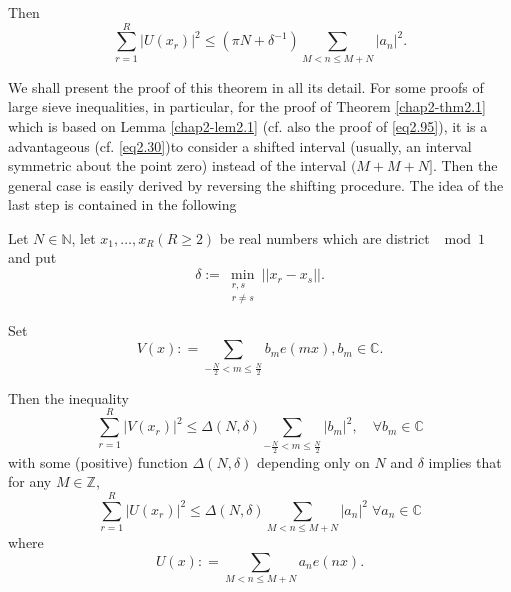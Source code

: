 Then
\begin{equation*}
\sum_{r=1}^R |U (x_r) |^2 \leq ( \pi N+ \delta^{-1}) \sum_{M < n \leq
  M+N}|a_n|^2. \tag{2.11}\label{eq2.11}
\end{equation*}

We shall present the proof of this theorem in all its detail. For some
proofs of large sieve inequalities, in particular, for the proof of
Theorem \ref{chap2-thm2.1} which is based on Lemma \ref{chap2-lem2.1} 
(cf. also the proof of \eqref{eq2.95}), it is a advantageous
(cf. \eqref{eq2.30})\pageoriginale  to consider a shifted
interval (usually, an interval symmetric about the point zero)
instead of the interval $(M + M + N]$. Then the general case is easily
  derived by reversing the shifting procedure. The idea of the last
  step is contained in the following
  
\setcounter{section}{2}
\begin{lemma}\label{chap2-lem2.2} %
Let $N \in \mathbb{N}$, let $x_1, \ldots, x_R (R \geq 2)$ be real
numbers which are district $\mod 1$ and put 
\begin{equation*}
\delta := \min_{\substack{r,s\\ r \neq s}} || x_r -x_s
||. \tag{2.12}\label{eq2.12} 
\end{equation*}

Set
\begin{equation*}
V(x): = \sum_{-\frac{N}{2}< m \leq \frac{N}{2}} b_{m}e (mx), b_m \in
\mathbb{C}. \tag{2.13}\label{eq2.13} 
\end{equation*}
\end{lemma}

Then the inequality
\begin{equation*}
\sum_{r=1}^{R}| V (x_r)|^2 \leq \Delta (N, \delta )
\sum_{-\frac{N}{2}<m \leq \frac{N}{2}} |b_m|^2,\quad \forall b_m \in
\mathbb{C} \tag{2.14} \label{eq2.14} 
\end{equation*}
with some (positive) function $\Delta (N, \delta)$ depending only on
$N$ and $\delta$ implies that for any $M \in \mathbb{Z}$, 
\begin{equation*}
\sum_{r=1}^{R}| U (x_r)|^2 \leq \Delta (N, \delta ) \sum_{M < n \leq M
  + N} |a_n|^2 \; \forall a_n \in   \mathbb{C} \tag{2.15}\label{eq2.15} 
\end{equation*}
where 
\begin{equation*}
U(x): = \sum_{M< n \leq M+N} a_n e(nx).\tag{2.16}\label{eq2.16}
\end{equation*}

